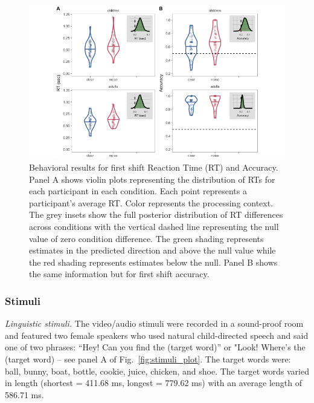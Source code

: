 \documentclass[10pt, letterpaper]{article}
\newenvironment{CodeChunk}{}{}
\begin{document}
\begin{CodeChunk}
\begin{figure}[t]

{\centering \includegraphics[width=0.85\linewidth]{figs/noise_acc_rt_e1_plot-1} 

}

\caption[Behavioral results for first shift Reaction Time (RT) and Accuracy]{Behavioral results for first shift Reaction Time (RT) and Accuracy. Panel A shows violin plots representing the distribution of RTs for each participant in each condition. Each point represents a participant's average RT. Color represents the processing context. The grey insets show the full posterior distribution of RT differences across conditions with the vertical dashed line representing the null value of zero condition difference. The green shading represents estimates in the predicted direction and above the null value while the red shading represents estimates below the null. Panel B shows the same information but for first shift accuracy.}\label{fig:noise_acc_rt_e1_plot}
\end{figure}
\end{CodeChunk}

\hypertarget{stimuli}{%
\subsubsection{Stimuli}\label{stimuli}}

\emph{Linguistic stimuli.} The video/audio stimuli were recorded in a
sound-proof room and featured two female speakers who used natural
child-directed speech and said one of two phrases: ``Hey! Can you find
the (target word)'' or "Look! Where's the (target word) -- see panel A
of Fig.~\ref{fig:stimuli_plot}. The target words were: ball, bunny,
boat, bottle, cookie, juice, chicken, and shoe. The target words varied
in length (shortest = 411.68 ms, longest = 779.62 ms) with an average
length of 586.71 ms.
\end{document}

